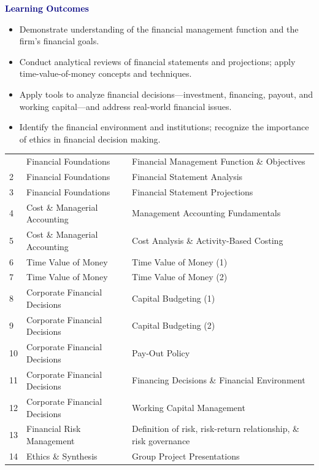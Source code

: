 \begin{minipage}[t]{.66\textwidth}\vspace{0pt}
\textcolor{navy}{\large\bfseries Learning Outcomes}\par
\begin{itemize}
\item Demonstrate understanding of the financial management function and the firm's financial goals.
\item Conduct analytical reviews of financial statements and projections; apply time-value-of-money concepts and techniques.
\item Apply tools to analyze financial decisions---investment, financing, payout, and working capital---and address real-world financial issues.
\item Identify the financial environment and institutions; recognize the importance of ethics in financial decision making.
\end{itemize}
\end{minipage}\hfill
\begin{minipage}[t]{.32\textwidth}\vspace{0pt}
\end{minipage}
\begin{tabularx}{\textwidth}{M{1.8cm}YY}&Financial Foundations&Financial Management Function \& Objectives\\
2&Financial Foundations&Financial Statement Analysis\\
3&Financial Foundations&Financial Statement Projections\\
4&Cost \& Managerial Accounting&Management Accounting Fundamentals\\
5&Cost \& Managerial Accounting&Cost Analysis \& Activity-Based Costing\\
6&Time Value of Money&Time Value of Money (1)\\
7&Time Value of Money&Time Value of Money (2)\\
8&Corporate Financial Decisions&Capital Budgeting (1)\\
9&Corporate Financial Decisions&Capital Budgeting (2)\\
10&Corporate Financial Decisions&Pay-Out Policy\\
11&Corporate Financial Decisions&Financing Decisions \& Financial Environment\\
12&Corporate Financial Decisions&Working Capital Management\\
13&Financial Risk Management&Definition of risk, risk-return relationship, \& risk governance\\
14&Ethics \& Synthesis&Group Project Presentations\\
\end{tabularx}

